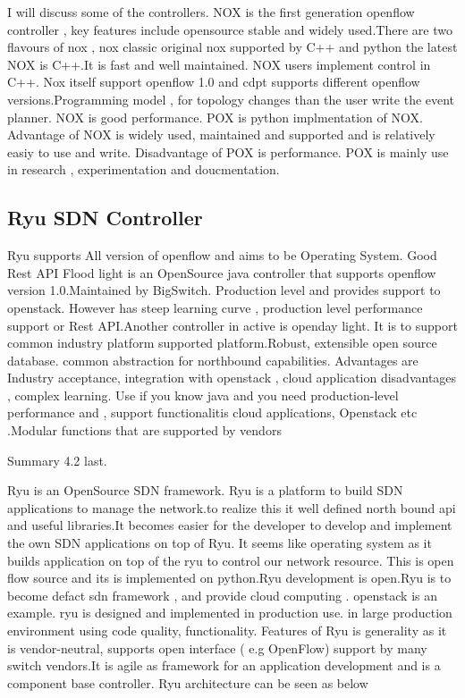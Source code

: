 I will discuss some of the controllers. NOX is the first generation openflow controller , key features include opensource stable and widely used.There are two flavours of nox , nox classic original nox supported by C++ and python the latest NOX is C++.It is fast and well maintained. NOX users implement control in C++. Nox itself support openflow 1.0 and cdpt supports different openflow versions.Programming model , for topology changes than the user write the event planner. NOX is good performance. POX is python implmentation of NOX. Advantage of NOX is widely used, maintained and supported and is relatively easiy to use and write. Disadvantage of POX is performance. POX is mainly use in research , experimentation and doucmentation.

\subsection{Ryu SDN Controller}

Ryu supports All version of openflow and aims to be Operating System. Good Rest API
Flood light is an OpenSource java controller that supports openflow  version 1.0.Maintained by BigSwitch. Production level and provides support to openstack. However has steep learning curve , production level performance support or Rest API.Another controller in active is openday light. It is to support common industry platform supported platform.Robust, extensible open source database. common abstraction for northbound capabilities. Advantages are Industry acceptance, integration with openstack , cloud application disadvantages , complex learning. Use if you know java and you need production-level performance and , support functionalitis cloud applications, Openstack etc .Modular functions that are supported by vendors 

Summary 4.2 last.

Ryu is an OpenSource SDN framework. Ryu is a platform to build  SDN applications to manage the network.to realize this it  well defined north bound api and useful libraries.It becomes easier for the developer to develop  and implement the own SDN applications on top of Ryu.  It seems like operating system as it builds application on top of the ryu to control our network resource. This is open flow source and its is implemented on python.Ryu development is open.Ryu is to become defact sdn framework , and provide cloud computing . openstack is an example. ryu is designed and implemented in production use. in large production environment using code quality, functionality. 
Features of Ryu is generality as it is vendor-neutral, supports open interface ( e.g OpenFlow) support by many switch vendors.It is agile as framework for an application development and is a component base controller. Ryu architecture can be seen as below

